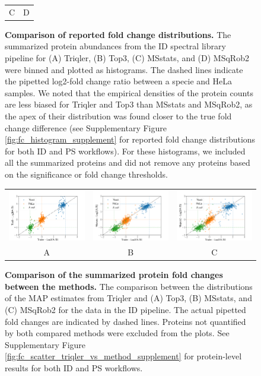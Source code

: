 \documentclass[10pt,letterpaper]{article}
\begin{document}
\begin{figure}[hbt]
\begin{tabular}{cc}
        C & D 
    \end{tabular}
    \caption{{\bf Comparison of reported fold change distributions.} The summarized protein abundances from the ID spectral library pipeline for (A) Triqler, (B) Top3, (C) MSstats, and (D) MSqRob2 were binned and plotted as histograms. The dashed lines indicate the pipetted log2-fold change ratio between a specie and HeLa samples. We noted that the empirical densities of the protein counts are less biased for Triqler and Top3 than MSstats and MSqRob2, as the apex of their distribution was found closer to the true fold change difference (see Supplementary Figure \ref{fig:fc_histogram_supplement} for reported fold change distributions for both ID and PS workflows). For these histograms, we included all the summarized proteins and did not remove any proteins based on  the significance or fold change thresholds. \label{fig:fc_histogram}}
\end{figure}


\begin{figure}[hbt]
    \centering
    \begin{tabular}{ccc}
        \includegraphics[width=0.33\linewidth]{./img/scatter_ID_triqler_vs_top3.png} & 
        \includegraphics[width=0.33\linewidth]{./img/scatter_ID_triqler_vs_msstats.png} & 
        \includegraphics[width=0.33\linewidth]{./img/scatter_ID_triqler_vs_msqrob2.png} \\
        A & B & C
    \end{tabular}
    \caption{{\bf Comparison of the summarized protein fold changes between the methods.} The comparison between the distributions of the MAP estimates from Triqler and (A) Top3, (B) MSstats, and (C) MSqRob2 for the data in the ID pipeline. The actual pipetted fold changes are indicated by dashed lines. Proteins not quantified by both compared methods were excluded from the plots. See Supplementary Figure \ref{fig:fc_scatter_triqler_vs_method_supplement} for protein-level results for both ID and PS workflows. \label{fig:fc_scatter}}
\end{figure}
\end{document}
